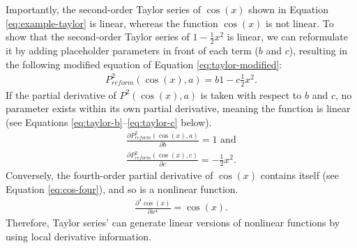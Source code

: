 \documentclass[
12pt, %
twoside,
english]{guelphthesis}
\begin{document}
\noindent Importantly, the second-order Taylor series of \(\cos(x)\) shown in Equation \ref{eq:example-taylor} is linear, whereas the function \(\cos(x)\) is not linear. To show that the second-order Taylor series of \(1- \frac{1}{2}x^2\) is linear, we can reformulate it by adding placeholder parameters in front of each term (\(b\) and \(c\)), resulting in the following modified equation of Equation \ref{eq:taylor-modified}:
\begin{align}
P^2_{reform}(\cos(x), a) = b1- c\frac{1}{2}x^2. 
\label{eq:taylor-modified}
\end{align}
\noindent If the partial derivative of \(P^2(\cos(x), a)\) is taken with respect to \(b\) and \(c\), no parameter exists within its own partial derivative, meaning the function is linear (see Equations \ref{eq:taylor-b}--\ref{eq:taylor-c} below).
\begin{align}
\frac{\partial P^2_{reform}(\cos(x), a)}{\partial b} = 1 \text{ and} \label{eq:taylor-b}\\
\frac{\partial P^2_{reform}(\cos(x), c)}{\partial c} = -\frac{1}{2}x^2. \label{eq:taylor-c}
\end{align}
\noindent Conversely, the fourth-order partial derivative of \(\cos(x)\) contains itself (see Equation \ref{eq:cos-four}), and so is a nonlinear function.
\begin{align}
\frac{\partial^4 \cos(x)}{\partial x^4}  = \cos(x).
\label{eq:cos-four} 
\end{align}
\noindent Therefore, Taylor series' can generate linear versions of nonlinear functions by using local derivative information.
\end{document}
